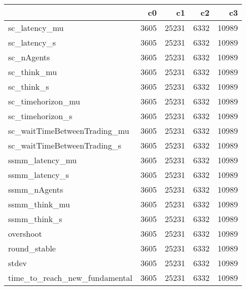 \begin{tabular}{lrrrr}
\toprule
{} &    c0 &     c1 &    c2 &     c3 \\
\midrule
sc\_latency\_mu                 &  3605 &  25231 &  6332 &  10989 \\
sc\_latency\_s                  &  3605 &  25231 &  6332 &  10989 \\
sc\_nAgents                    &  3605 &  25231 &  6332 &  10989 \\
sc\_think\_mu                   &  3605 &  25231 &  6332 &  10989 \\
sc\_think\_s                    &  3605 &  25231 &  6332 &  10989 \\
sc\_timehorizon\_mu             &  3605 &  25231 &  6332 &  10989 \\
sc\_timehorizon\_s              &  3605 &  25231 &  6332 &  10989 \\
sc\_waitTimeBetweenTrading\_mu  &  3605 &  25231 &  6332 &  10989 \\
sc\_waitTimeBetweenTrading\_s   &  3605 &  25231 &  6332 &  10989 \\
ssmm\_latency\_mu               &  3605 &  25231 &  6332 &  10989 \\
ssmm\_latency\_s                &  3605 &  25231 &  6332 &  10989 \\
ssmm\_nAgents                  &  3605 &  25231 &  6332 &  10989 \\
ssmm\_think\_mu                 &  3605 &  25231 &  6332 &  10989 \\
ssmm\_think\_s                  &  3605 &  25231 &  6332 &  10989 \\
overshoot                     &  3605 &  25231 &  6332 &  10989 \\
round\_stable                  &  3605 &  25231 &  6332 &  10989 \\
stdev                         &  3605 &  25231 &  6332 &  10989 \\
time\_to\_reach\_new\_fundamental &  3605 &  25231 &  6332 &  10989 \\
\bottomrule
\end{tabular}

